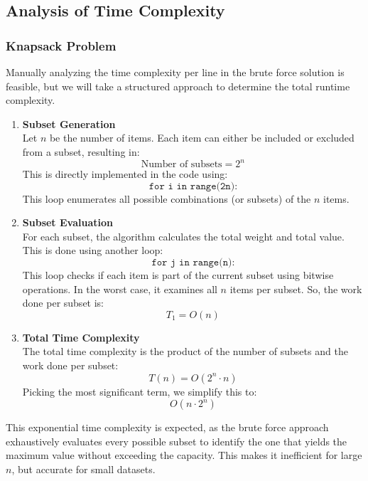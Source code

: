 \subsection{Analysis of Time Complexity}

\subsubsection{Knapsack Problem}


Manually analyzing the time complexity per line in the brute force solution is feasible, but we will take a structured approach to determine the total runtime complexity.

\begin{enumerate}[label=\textbf{\arabic*.}]
    \item \textbf{Subset Generation} \\
    Let $n$ be the number of items. Each item can either be included or excluded from a subset, resulting in:
    \[
        \text{Number of subsets} = 2^n
    \]
    This is directly implemented in the code using:
    \[
        \texttt{for i in range(2\^{}n):}
    \]
    This loop enumerates all possible combinations (or subsets) of the $n$ items.

    \item \textbf{Subset Evaluation} \\
    For each subset, the algorithm calculates the total weight and total value. This is done using another loop:
    \[
        \texttt{for j in range(n):}
    \]
    This loop checks if each item is part of the current subset using bitwise operations. In the worst case, it examines all $n$ items per subset. So, the work done per subset is:
    \[
        T_1 = O(n)
    \]

    \item \textbf{Total Time Complexity} \\
    The total time complexity is the product of the number of subsets and the work done per subset:
    \[
        T(n) = O(2^n \cdot n)
    \]
    Picking the most significant term, we simplify this to:
    \[
        \boxed{O(n \cdot 2^n)}
    \]
\end{enumerate}

This exponential time complexity is expected, as the brute force approach exhaustively evaluates every possible subset to identify the one that yields the maximum value without exceeding the capacity. This makes it inefficient for large $n$, but accurate for small datasets.
